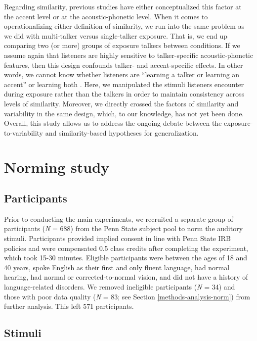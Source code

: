 \documentclass[preprint, 3p, authoryear]{elsarticle} %
\begin{document}
Regarding similarity, previous studies have either conceptualized this factor at the accent level or at the acoustic-phonetic level.
When it comes to operationalizing either definition of similarity, we run into the same problem as we did with multi-talker versus single-talker exposure.
That is, we end up comparing two (or more) groups of exposure talkers between conditions.
If we assume again that listeners are highly sensitive to talker-specific acoustic-phonetic features, then this design confounds talker- and accent-specific effects.
In other words, we cannot know whether listeners are ``learning a talker or learning an accent'' or learning both \citep{xie2017similarity}.
Here, we manipulated the stimuli listeners encounter during exposure rather than the talkers in order to maintain consistency across levels of similarity.
Moreover, we directly crossed the factors of similarity and variability in the same design, which, to our knowledge, has not yet been done.
Overall, this study allows us to address the ongoing debate between the exposure-to-variability and similarity-based hypotheses for generalization.

\hypertarget{norming-study}{%
\section{Norming study}\label{norming-study}}

\hypertarget{methods-pars-norm}{%
\subsection{Participants}\label{methods-pars-norm}}

Prior to conducting the main experiments, we recruited a separate group of participants (\emph{N} = 688) from the Penn State subject pool to norm the auditory stimuli.
Participants provided implied consent in line with Penn State IRB policies and were compensated 0.5 class credits after completing the experiment, which took 15-30 minutes.
Eligible participants were between the ages of 18 and 40 years, spoke English as their first and only fluent language, had normal hearing, had normal or corrected-to-normal vision, and did not have a history of language-related disorders.
We removed ineligible participants (\emph{N} = 34) and those with poor data quality (\emph{N} = 83; see Section \ref{methods-analysis-norm}) from further analysis.
This left 571 participants.

\hypertarget{methods-stims}{%
\subsection{Stimuli}\label{methods-stims}}
\end{document}
